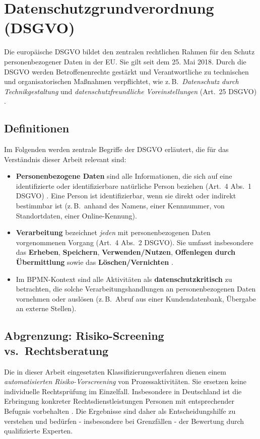 \section{Datenschutzgrundverordnung (DSGVO)}\label{sec:dsgvo}

Die europäische \acf{DSGVO} \cite{GDPR2016} bildet den zentralen rechtlichen Rahmen für den Schutz personenbezogener Daten in der \ac{EU}. Sie gilt seit dem 25. Mai 2018. Durch die \ac{DSGVO} werden Betroffenenrechte gestärkt und Verantwortliche zu technischen und organisatorischen Maßnahmen verpflichtet, wie z.\,B.\ \emph{Datenschutz durch Technikgestaltung} und \emph{datenschutzfreundliche Voreinstellungen} (Art.~25 DSGVO) \cite{gdpr-guidelines-2019}.

\subsection*{Definitionen}

Im Folgenden werden zentrale Begriffe der \ac{DSGVO} erläutert, die für das Verständnis dieser Arbeit relevant sind:

\begin{itemize}
    \item \textbf{Personenbezogene Daten} sind alle Informationen, die sich auf eine identifizierte oder identifizierbare natürliche Person beziehen (Art.~4 Abs.~1 DSGVO) \cite{GDPR2016}. Eine Person ist identifizierbar, wenn sie direkt oder indirekt bestimmbar ist (z.\,B.\ anhand des Namens, einer Kennnummer, von Standortdaten, einer Online-Kennung).
    \item \textbf{Verarbeitung} bezeichnet \emph{jeden} mit personenbezogenen Daten vorgenommenen Vorgang (Art.~4 Abs.~2 DSGVO). Sie umfasst insbesondere das \textbf{Erheben}, \textbf{Speichern}, \textbf{Verwenden/Nutzen}, \textbf{Offenlegen durch Übermittlung} sowie das \textbf{Löschen/Vernichten} \cite{GDPR2016}.
    \item Im \ac{BPMN}-Kontext sind alle Aktivitäten als \textbf{datenschutzkritisch} zu betrachten, die solche Verarbeitungshandlungen an personenbezogenen Daten vornehmen oder auslösen (z.\,B.\ Abruf aus einer Kundendatenbank, Übergabe an externe Stellen).
\end{itemize}

\subsection*{Abgrenzung: Risiko-Screening vs.\ Rechtsberatung}

Die in dieser Arbeit eingesetzten Klassifizierungsverfahren dienen einem \emph{automatisierten Risiko-Vorscreening} von Prozessaktivitäten. Sie ersetzen keine individuelle Rechtsprüfung im Einzelfall. Insbesondere in Deutschland ist die Erbringung konkreter Rechtsdienstleistungen Personen mit entsprechender Befugnis vorbehalten \cite{rdg-2007}. Die Ergebnisse sind daher als Entscheidungshilfe zu verstehen und bedürfen - insbesondere bei Grenzfällen - der Bewertung durch qualifizierte Experten.